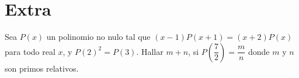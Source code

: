 \section{Extra}

\begin{section-problem}
    Sea $P(x)$ un polinomio no nulo tal que $(x - 1)P(x + 1) = (x + 2)P(x)$ para todo real $x$, y $P(2)^2 = P(3)$.
    Hallar $m + n$, si $P\left(\dfrac{7}{2}\right) = \dfrac{m}{n}$ donde $m$ y $n$ son primos relativos.
\end{section-problem}